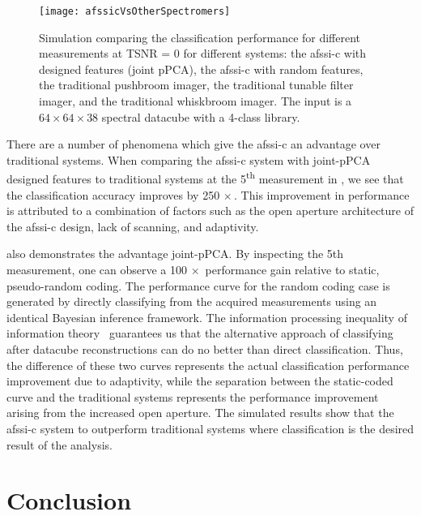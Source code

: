 \begin{figure}[htb]
  \centering
  \texttt{[image: afssicVsOtherSpectromers]}\\
  \caption{Simulation comparing the classification performance for different measurements at TSNR = 0 for different systems: the \gls{afssi-c} with designed features (joint pPCA), the \gls{afssi-c} with random features, the traditional pushbroom imager, the traditional tunable filter imager, and the traditional whiskbroom imager. The input is a $64 \times 64 \times 38$ spectral datacube with a 4-class library.} \label{fig:afssicVsOtherSpectromers}
\end{figure}
%
There are a number of phenomena which give the \gls{afssi-c} an advantage over traditional systems. When comparing the \gls{afssi-c} system with joint-pPCA designed features to traditional systems at the 5\textsuperscript{th} measurement in , we see that the classification accuracy improves by 250$\,\times$. This improvement in performance is attributed to a combination of factors such as the open aperture architecture of the \gls{afssi-c} design, lack of scanning, and adaptivity. 

 also demonstrates the advantage joint-pPCA. By inspecting the 5th measurement, one can observe a 100$\,\times$ performance gain relative to static, pseudo-random coding. The performance curve for the random coding case is generated by directly classifying from the acquired measurements using an identical Bayesian inference framework. The information processing inequality of information theory~\cite{cover2012elements} guarantees us that the alternative approach of classifying after datacube reconstructions can do no better than direct classification. Thus, the difference of these two curves represents the actual classification performance improvement due to adaptivity, while the separation between the static-coded curve and the traditional systems represents the performance improvement arising from the increased open aperture. The simulated results show that the \gls{afssi-c} system to outperform traditional systems where classification is the desired result of the analysis.


\section{Conclusion}

